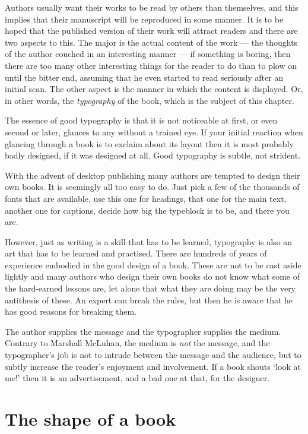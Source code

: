 \documentclass[10pt,letterpaper,extrafontsizes]{memoir}
\begin{document}
    Authors usually want their works to be read by others than themselves,
and this implies that their manuscript will be reproduced in some manner.
It is to be hoped that the published version of their work will attract 
readers and there are two aspects to this. The major is the actual content
of the work --- the thoughts of the author couched in an interesting
manner --- if something is boring, then there are too many other interesting
things for the reader to do than to plow on until the bitter end, 
assuming that he
even started to read seriously after an initial scan. The other aspect is
the manner in which the content is displayed. Or, in other words, 
the \emph{typography}
of the book, which is the subject of this chapter.

    The essence of good typography is that it is not noticeable at first,
or even second or later, glances to any without a trained eye. If your
initial reaction when glancing through a book is to exclaim about its layout
then it is most probably badly designed, if it was designed at all. Good
typography is subtle, not strident. 

    With the advent of desktop publishing
many authors are tempted to design their own books. It is seemingly all
too easy to do. Just pick a few of the thousands of fonts that are available,
use this one for headings, 
that one for the main text, another one for
captions, decide how big the typeblock is to be, and there you are.

    However, just as writing is a skill that has to be learned, typography
is also an art that has to be learned and practised. There are hundreds
of years of experience embodied in the good design of a book. These are
not to be cast aside lightly and many authors who design their own books
do not know what some of the hard-earned lessons are, let alone that what
they are doing may be the very antithesis of these. An expert can break
the rules, but then he is aware that he has good reasons for breaking them.

    The author supplies the message and the typographer supplies the medium.
Contrary to Marshall McLuhan, the medium is \emph{not} the message, 
and the typographer's job is not to
intrude between the message and the audience, but to subtly increase the
reader's enjoyment and involvement. If a book shouts `look at me!' then it
is an advertisement, and a bad one at that, for the designer.


\section{The shape of a book}
\end{document}
